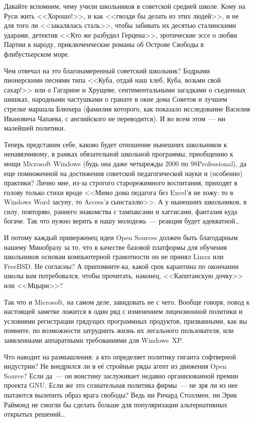 Давайте вспомним, чему учили школьников в советской средней школе. Кому на Руси жить <<Хорошо!>>, и как <<гвозди бы делать из этих людей>>, и не для того ли <<закалялась сталь>>, чтобы забивать их десятью сталинскими ударами, детектив <<Кто же разбудил Герцена>>, эротические эссе о любви Партии к народу, приключенческие романы об Острове Свободы в флибустьерском море.

Чем отвечал на это благонамеренный советский школьник? Бодрыми пионерскими песнями типа <<Куба, отдай наш хлеб, Куба, возьми свой сахар!>> или о Гагарине и Хрущеве, сентиментальными загадками о съеденных шишках, народными частушками о гранате в окне дома Советов и лучшем стрелке маршала Блюхера (фамилия которого, как показало исследование Василия Ивановича Чапаева, с английского не переводится). И во всем этом~--- ни малейшей политики.

Теперь представим себе, каково будет отношение нынешних школьников к ненавязчивому, в рамках обязательной школьной программы, приобщению к мощи Microsoft Windows (будь она даже четырежды 2000 по 98Professional), да еще помноженной на достижения советской педагогической науки и (особенно) практики? Лично мне, из-за строгого старорежимного воспитания, приходят в голову только стихи вроде <<Мимо дома педагога без Excel'я не хожу: то в Windows Word засуну, то Access'а сынсталлю>>. А у нынешних школьников, в силу, повторяю, раннего знакомства с тампаксами и хаггисами, фантазия куда богаче. Так что нужно верить в нашу молодежь~--- реакция будет адекватной\dots

И потому каждый приверженец идеи Open Sources должен быть благодарным нашему Минобразу за то, что в качестве базовой платформы для обучения школьников основам компьютерной грамотности он не принял Linux или FreeBSD. Не согласны? А припомните-ка, какой срок карантина по окончании школы вам потребовался, чтобы прочитать, наконец, <<Капитанскую дочку>> или <<Мцыри>>?

Так что и Microsoft, на самом деле, завидовать не с чего. Вообще говоря, повод к настоящей заметке ложится в один ряд с изменением лицензионной политики и условиями регистрации грядущих программных продуктов, призванными, как вы помните, по возможности затруднить жизнь их легального пользователя, или заявленными аппаратными требованиями для Windows~XP.

Что наводит на размышления: а кто определяет политику гиганта софтверной индустрии? Не внедрился ли в её стройные ряды агент из движения Open Source? Если да~--- он воистину заслуживает недавно организованной премии проекта GNU. Если же это сознательная политика фирмы~--- не зря ли из нее пытаются вылепить образ врага свободы? Ведь ни Ричард Столлмен, ни Эрик Раймонд не смогли бы сделать больше для популяризации альтернативных открытых решений\dots

